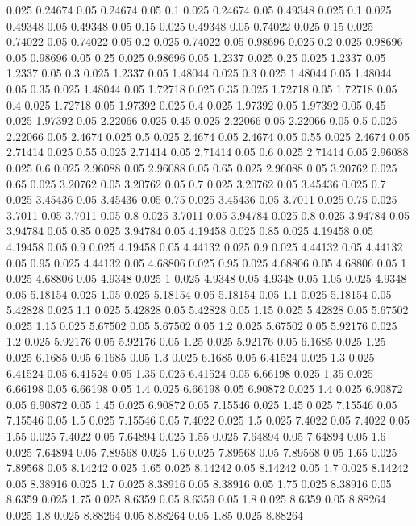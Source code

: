 0.025 0.24674
0.05 0.24674
0.05 0.1
0.025 0.24674
0.05 0.49348
0.025 0.1
0.025 0.49348
0.05 0.49348
0.05 0.15
0.025 0.49348
0.05 0.74022
0.025 0.15
0.025 0.74022
0.05 0.74022
0.05 0.2
0.025 0.74022
0.05 0.98696
0.025 0.2
0.025 0.98696
0.05 0.98696
0.05 0.25
0.025 0.98696
0.05 1.2337
0.025 0.25
0.025 1.2337
0.05 1.2337
0.05 0.3
0.025 1.2337
0.05 1.48044
0.025 0.3
0.025 1.48044
0.05 1.48044
0.05 0.35
0.025 1.48044
0.05 1.72718
0.025 0.35
0.025 1.72718
0.05 1.72718
0.05 0.4
0.025 1.72718
0.05 1.97392
0.025 0.4
0.025 1.97392
0.05 1.97392
0.05 0.45
0.025 1.97392
0.05 2.22066
0.025 0.45
0.025 2.22066
0.05 2.22066
0.05 0.5
0.025 2.22066
0.05 2.4674
0.025 0.5
0.025 2.4674
0.05 2.4674
0.05 0.55
0.025 2.4674
0.05 2.71414
0.025 0.55
0.025 2.71414
0.05 2.71414
0.05 0.6
0.025 2.71414
0.05 2.96088
0.025 0.6
0.025 2.96088
0.05 2.96088
0.05 0.65
0.025 2.96088
0.05 3.20762
0.025 0.65
0.025 3.20762
0.05 3.20762
0.05 0.7
0.025 3.20762
0.05 3.45436
0.025 0.7
0.025 3.45436
0.05 3.45436
0.05 0.75
0.025 3.45436
0.05 3.7011
0.025 0.75
0.025 3.7011
0.05 3.7011
0.05 0.8
0.025 3.7011
0.05 3.94784
0.025 0.8
0.025 3.94784
0.05 3.94784
0.05 0.85
0.025 3.94784
0.05 4.19458
0.025 0.85
0.025 4.19458
0.05 4.19458
0.05 0.9
0.025 4.19458
0.05 4.44132
0.025 0.9
0.025 4.44132
0.05 4.44132
0.05 0.95
0.025 4.44132
0.05 4.68806
0.025 0.95
0.025 4.68806
0.05 4.68806
0.05 1
0.025 4.68806
0.05 4.9348
0.025 1
0.025 4.9348
0.05 4.9348
0.05 1.05
0.025 4.9348
0.05 5.18154
0.025 1.05
0.025 5.18154
0.05 5.18154
0.05 1.1
0.025 5.18154
0.05 5.42828
0.025 1.1
0.025 5.42828
0.05 5.42828
0.05 1.15
0.025 5.42828
0.05 5.67502
0.025 1.15
0.025 5.67502
0.05 5.67502
0.05 1.2
0.025 5.67502
0.05 5.92176
0.025 1.2
0.025 5.92176
0.05 5.92176
0.05 1.25
0.025 5.92176
0.05 6.1685
0.025 1.25
0.025 6.1685
0.05 6.1685
0.05 1.3
0.025 6.1685
0.05 6.41524
0.025 1.3
0.025 6.41524
0.05 6.41524
0.05 1.35
0.025 6.41524
0.05 6.66198
0.025 1.35
0.025 6.66198
0.05 6.66198
0.05 1.4
0.025 6.66198
0.05 6.90872
0.025 1.4
0.025 6.90872
0.05 6.90872
0.05 1.45
0.025 6.90872
0.05 7.15546
0.025 1.45
0.025 7.15546
0.05 7.15546
0.05 1.5
0.025 7.15546
0.05 7.4022
0.025 1.5
0.025 7.4022
0.05 7.4022
0.05 1.55
0.025 7.4022
0.05 7.64894
0.025 1.55
0.025 7.64894
0.05 7.64894
0.05 1.6
0.025 7.64894
0.05 7.89568
0.025 1.6
0.025 7.89568
0.05 7.89568
0.05 1.65
0.025 7.89568
0.05 8.14242
0.025 1.65
0.025 8.14242
0.05 8.14242
0.05 1.7
0.025 8.14242
0.05 8.38916
0.025 1.7
0.025 8.38916
0.05 8.38916
0.05 1.75
0.025 8.38916
0.05 8.6359
0.025 1.75
0.025 8.6359
0.05 8.6359
0.05 1.8
0.025 8.6359
0.05 8.88264
0.025 1.8
0.025 8.88264
0.05 8.88264
0.05 1.85
0.025 8.88264
